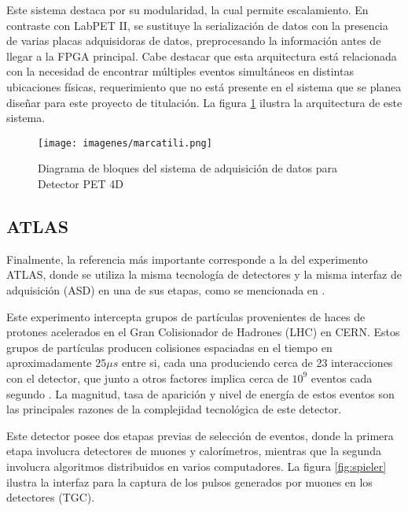 \par Este sistema destaca por su modularidad, la cual permite escalamiento. En contraste con LabPET II, se sustituye la serialización de datos con la presencia de varias placas adquisidoras de datos, preprocesando la información antes de llegar a la FPGA principal. Cabe destacar que esta arquitectura está relacionada con la necesidad de encontrar múltiples eventos simultáneos en distintas ubicaciones físicas, requerimiento que no está presente en el sistema que se planea diseñar para este proyecto de titulación. La figura \ref{fig:marcatili} ilustra la arquitectura de este sistema.

\begin{figure}[H]
	\centering
	\texttt{[image: imagenes/marcatili.png]}
	\caption{Diagrama de bloques del sistema de adquisición de datos para Detector PET 4D \cite{Marcatili2011DevelopmentDetector}}
	\label{fig:marcatili}
\end{figure}

\newpage
\subsection{ATLAS}

\par Finalmente, la referencia más importante corresponde a la del experimento ATLAS, donde se utiliza la misma tecnología de detectores y la misma interfaz de adquisición (ASD) en una de sus etapas, como se mencionada en \cite{Spieler2012ElectronicsAcquisition}.

\par Este experimento intercepta grupos de partículas provenientes de haces de protones acelerados en el Gran Colisionador de Hadrones (LHC) en CERN. Estos grupos de partículas producen colisiones espaciadas en el tiempo en aproximadamente $25\mu s$ entre si, cada una produciendo cerca de 23 interacciones con el detector, que junto a otros factores implica cerca de $10^9$ eventos cada segundo \cite{Whiteson2016TheSystem}. La magnitud, tasa de aparición y nivel de energía de estos eventos son las principales razones de la complejidad tecnológica de este detector.

\par Este detector posee dos etapas previas de selección de eventos, donde la primera etapa involucra detectores de muones y calorímetros, mientras que la segunda involucra algoritmos distribuidos en varios computadores. La figura \ref{fig:spieler} ilustra la interfaz para la captura de los pulsos generados por muones en los detectores (TGC).


